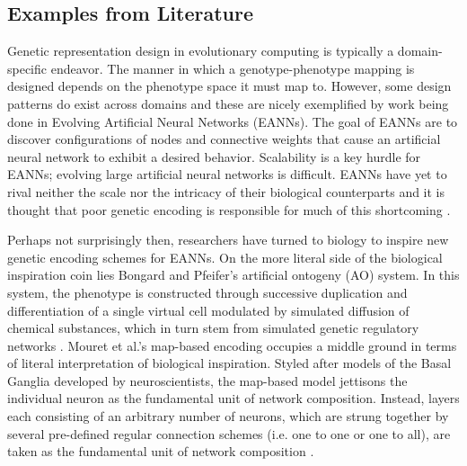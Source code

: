 \subsection{Examples from Literature}
Genetic representation design in evolutionary computing is typically a domain-specific endeavor.
The manner in which a genotype-phenotype mapping is designed depends on the phenotype space it must map to. However, some design patterns do exist across domains and these are nicely exemplified by work being done in Evolving Artificial Neural Networks (EANNs).
The goal of EANNs are to discover configurations of nodes and connective weights that cause an artificial neural network to exhibit a desired behavior.
Scalability is a key hurdle for EANNs; evolving large artificial neural networks is difficult.
EANNs have yet to rival neither the scale nor the intricacy of their biological counterparts and it is thought that poor genetic encoding is responsible for much of this shortcoming \cite{Tonelli2013OnNetworks}.

Perhaps not surprisingly then, researchers have turned to biology to inspire new genetic encoding schemes for EANNs.
On the more literal side of the biological inspiration coin lies Bongard and Pfeifer's artificial ontogeny (AO) system.
In this system, the phenotype is constructed through successive duplication and differentiation of a single virtual cell modulated by simulated diffusion of chemical substances, which in turn stem from simulated genetic regulatory networks \cite[p 345]{Downing2015IntelligenceSystems}.
Mouret et al.'s map-based encoding occupies a middle ground in terms of literal interpretation of biological inspiration.
Styled after models of the Basal Ganglia developed by neuroscientists, the map-based model jettisons the individual neuron as the fundamental unit of network composition.
Instead, layers each consisting of an arbitrary number of neurons, which are strung together by several pre-defined regular connection schemes (i.e. one to one or one to all), are taken as the fundamental unit of network composition \cite{Mouret2010ImportingGanglia}.

